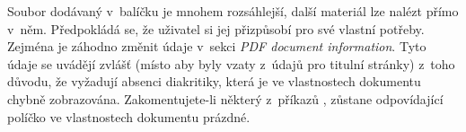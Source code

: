 Soubor  dodávaný v~balíčku \pkg{\ipotname} je mnohem
rozsáhlejší, další materiál lze nalézt přímo v~něm. Předpokládá se, že
uživatel si jej přizpůsobí pro své vlastní potřeby. Zejména je záhodno změnit
údaje v~sekci \emph{PDF document information}. Tyto údaje se uvádějí zvlášť
(místo aby byly vzaty z~údajů pro titulní stránky) z~toho důvodu, že vyžadují absenci diakritiky,
která je ve vlastnostech dokumentu chybně zobrazována. Zakomentujete-li
některý z~příkazů , zůstane odpovídající políčko
ve vlastnostech dokumentu prázdné.



\endinput

